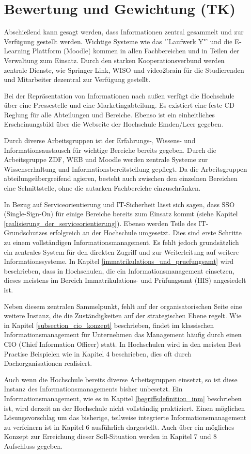\section{Bewertung und Gewichtung (TK)}

Abschießend kann gesagt werden, dass Informationen zentral gesammelt und zur Verfügung gestellt werden. 
Wichtige Systeme wie das "'Laufwerk Y"' und die E-Learning Plattform (Moodle) kommen in allen 
Fachbereichen und in Teilen der Verwaltung zum Einsatz. Durch den starken Kooperationsverbund werden 
zentrale Dienste, wie Springer Link, WISO und video2brain für die Studierenden und Mitarbeiter dezentral zur 
Verfügung gestellt. 

Bei der Repräsentation von Informationen nach außen verfügt die Hochschule über eine Pressestelle und eine 
Marketingabteilung. Es existiert eine feste CD-Reglung für alle Abteilungen und Bereiche. Ebenso ist ein 
einheitliches Erscheinungsbild über die Webseite der Hochschule Emden/Leer gegeben.

Durch diverse Arbeitsgruppen ist der Erfahrungs-, Wissens- und Informationsaustausch für wichtige Bereiche 
bereits gegeben. Durch die Arbeitsgruppe ZDF, WEB und Moodle werden zentrale Systeme zur 
Wissenserhaltung und Informationsbereitstellung gepflegt. Da die Arbeitsgruppen abteilungsübergreifend 
agieren, besteht auch zwischen den einzelnen Bereichen eine Schnittstelle, ohne die autarken Fachbereiche 
einzuschränken. 

In Bezug auf Serviceorientierung und IT-Sicherheit lässt sich sagen, dass SSO (Single-Sign-On) für einige 
Bereiche bereits zum Einsatz kommt (siehe Kapitel \ref{realisierung_der_serviceorientierung}). Ebenso werden 
Teile des IT-Grundschutzes erfolgreich an der Hochschule umgesetzt. Dies sind erste Schritte zu einem 
vollständigen Informationsmanagement. Es fehlt jedoch grundsätzlich ein zentrales System für den direkten 
Zugriff und zur Weiterleitung auf weitere Informationssysteme. In Kapitel 
\ref{immatrikulations_und_pruefungsamt} wird beschrieben, dass in Hochschulen, die ein 
Informationsmanagement einsetzen, dieses meistens im Bereich Immatrikulations- und Prüfungsamt (HIS) 
angesiedelt ist. 

Neben diesem zentralen Sammelpunkt, fehlt auf der organisatorischen Seite eine weitere Instanz, die die 
Zuständigkeiten auf der strategischen Ebene regelt. Wie in Kapitel \ref{subsection_cio_konzept} beschrieben, findet im 
klassischen Informationsmanagement für Unternehmen das Management häufig durch einen CIO (Chief 
Information Officer) statt. In Hochschulen wird in den meisten Best Practise Beispielen wie in Kapitel 4 
beschrieben, dies oft durch Dachorganisationen realisiert.

Auch wenn die Hochschule bereits diverse Arbeitsgruppen einsetzt, so ist diese Instanz des 
Informationsmanagements bisher unbesetzt. Ein Informationsmanagement, wie es in Kapitel 
\ref{begriffsdefinition_inm} beschrieben ist, wird derzeit an der Hochschule nicht vollständig praktiziert. Einen 
möglichen Lösungsvorschlag um das bisherige, teilweise integrierte Informationsmanagement zu verfeinern 
ist in Kapitel 6 ausführlich dargestellt. Auch über ein mögliches Konzept zur Erreichung dieser Soll-Situation 
werden in Kapitel 7 und 8 Aufschluss gegeben.